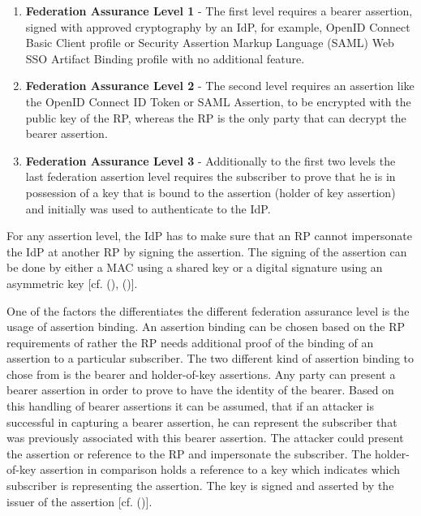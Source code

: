 \begin{enumerate}
	\item \textbf{Federation Assurance Level 1}  - The first level requires a bearer assertion,
	signed with approved cryptography by an IdP, for example, OpenID Connect
	Basic Client profile or Security Assertion Markup Language (SAML) Web SSO
	Artifact Binding profile with no additional feature.
	
	\item \textbf{Federation Assurance Level 2} - The second level requires an assertion like the
	OpenID Connect ID Token or SAML Assertion, to be encrypted with the public
	key of the RP, whereas the RP is the only party that can decrypt the bearer
	assertion.
	
	\item \textbf{Federation Assurance Level 3} - Additionally to the first two levels the last federation assertion level requires the subscriber to prove that he is in possession of a key that is bound to the assertion (holder of key assertion) and initially was used to authenticate to the IdP. 
	
\end{enumerate}
For any assertion level, the IdP has to make sure that an RP cannot impersonate the IdP at another RP by signing the assertion. The signing of the assertion can be done by either a MAC using a shared key or a digital signature using an asymmetric key [cf. (\cite{NIST:2017:DIG}), (\cite{NIST:2017:DIGFA})].  

One of the factors the differentiates the different federation assurance level is the usage of assertion binding. An assertion binding can be chosen based on the RP requirements of rather the RP needs additional proof of the binding of an assertion to a particular subscriber. The two different kind of assertion binding to chose from is the bearer and holder-of-key assertions. Any party can present a bearer assertion in order to prove to have the identity of the bearer. Based on this handling of bearer assertions it can be assumed, that if an attacker is successful in capturing a bearer assertion, he can represent the subscriber that was previously associated with this bearer assertion. The attacker could present the assertion or reference to the RP and impersonate the subscriber. The holder-of-key assertion in comparison holds a reference to a key which indicates which subscriber is representing the assertion. The key is signed and asserted by the issuer of the assertion  [cf. (\cite{NIST:2017:DIGFA})].




